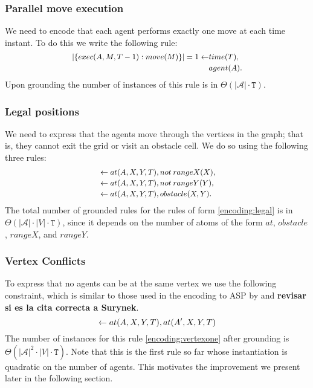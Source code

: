 \subsubsection{Parallel move execution}
We need to encode that each agent performs exactly one move at each time instant. To do this we write the following rule:
\begin{equation}\small\label{encoding:delta}
\begin{split}
|\{exec(A,M,T-1) : move(M) \}| = 1 \leftarrow &time(T),\\&agent(A).
\end{split}
\end{equation}
Upon grounding the number of instances of this rule is in $\Theta(|\mathcal{A}|\cdot \mathtt{T})$.
\subsubsection{Legal positions}
We need to express that the agents move through the vertices in the graph; that is, they cannot exit the grid or visit an obstacle cell. We do so using the following three rules:
\begin{equation}\label{encoding:legal}\small
    \begin{split}
&\leftarrow at(A,X,Y,T), not\: rangeX(X),\\
&\leftarrow at(A,X,Y,T), not\: rangeY(Y),\\
&\leftarrow at(A,X,Y,T), obstacle(X,Y). %
    \end{split}
\end{equation}
The total number of grounded rules for the rules of form \eqref{encoding:legal} is in $\Theta(|\mathcal{A}| \cdot |V| \cdot \mathtt{T})$, since it depends on the number of atoms of the form $at$, $obstacle$, $rangeX$, and $rangeY$.

\subsubsection{Vertex Conflicts}
To express that no agents can be at the same vertex we use the following constraint, which is similar to those used in the encoding to ASP by  and  \textbf{revisar si es la cita correcta a Surynek}.
\begin{equation}\small\label{encoding:vertexone}
    \leftarrow at(A,X,Y,T), at(A',X,Y,T)
\end{equation}
The number of instances for this rule \eqref{encoding:vertexone} after grounding is $\Theta(|\mathcal{A}|^2 \cdot |V| \cdot \mathtt{T})$. Note that this is the first rule so far whose instantiation is quadratic on the number of agents. This motivates the improvement we present later in the following section.
